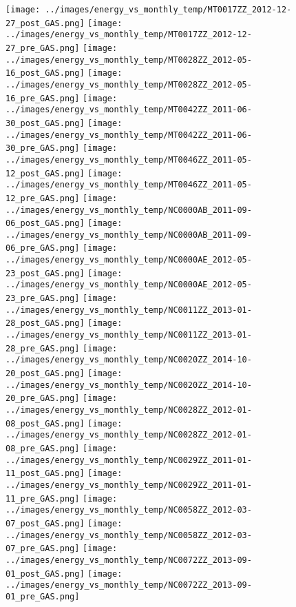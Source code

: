 \clearpage
\begin{figure}
\centering
\texttt{[image: ../images/energy\_vs\_monthly\_temp/MT0017ZZ\_2012-12-27\_post\_GAS.png]}
\texttt{[image: ../images/energy\_vs\_monthly\_temp/MT0017ZZ\_2012-12-27\_pre\_GAS.png]}
\texttt{[image: ../images/energy\_vs\_monthly\_temp/MT0028ZZ\_2012-05-16\_post\_GAS.png]}
\texttt{[image: ../images/energy\_vs\_monthly\_temp/MT0028ZZ\_2012-05-16\_pre\_GAS.png]}
\texttt{[image: ../images/energy\_vs\_monthly\_temp/MT0042ZZ\_2011-06-30\_post\_GAS.png]}
\texttt{[image: ../images/energy\_vs\_monthly\_temp/MT0042ZZ\_2011-06-30\_pre\_GAS.png]}
\texttt{[image: ../images/energy\_vs\_monthly\_temp/MT0046ZZ\_2011-05-12\_post\_GAS.png]}
\texttt{[image: ../images/energy\_vs\_monthly\_temp/MT0046ZZ\_2011-05-12\_pre\_GAS.png]}
\texttt{[image: ../images/energy\_vs\_monthly\_temp/NC0000AB\_2011-09-06\_post\_GAS.png]}
\texttt{[image: ../images/energy\_vs\_monthly\_temp/NC0000AB\_2011-09-06\_pre\_GAS.png]}
\texttt{[image: ../images/energy\_vs\_monthly\_temp/NC0000AE\_2012-05-23\_post\_GAS.png]}
\texttt{[image: ../images/energy\_vs\_monthly\_temp/NC0000AE\_2012-05-23\_pre\_GAS.png]}
\texttt{[image: ../images/energy\_vs\_monthly\_temp/NC0011ZZ\_2013-01-28\_post\_GAS.png]}
\texttt{[image: ../images/energy\_vs\_monthly\_temp/NC0011ZZ\_2013-01-28\_pre\_GAS.png]}
\texttt{[image: ../images/energy\_vs\_monthly\_temp/NC0020ZZ\_2014-10-20\_post\_GAS.png]}
\texttt{[image: ../images/energy\_vs\_monthly\_temp/NC0020ZZ\_2014-10-20\_pre\_GAS.png]}
\texttt{[image: ../images/energy\_vs\_monthly\_temp/NC0028ZZ\_2012-01-08\_post\_GAS.png]}
\texttt{[image: ../images/energy\_vs\_monthly\_temp/NC0028ZZ\_2012-01-08\_pre\_GAS.png]}
\texttt{[image: ../images/energy\_vs\_monthly\_temp/NC0029ZZ\_2011-01-11\_post\_GAS.png]}
\texttt{[image: ../images/energy\_vs\_monthly\_temp/NC0029ZZ\_2011-01-11\_pre\_GAS.png]}
\texttt{[image: ../images/energy\_vs\_monthly\_temp/NC0058ZZ\_2012-03-07\_post\_GAS.png]}
\texttt{[image: ../images/energy\_vs\_monthly\_temp/NC0058ZZ\_2012-03-07\_pre\_GAS.png]}
\texttt{[image: ../images/energy\_vs\_monthly\_temp/NC0072ZZ\_2013-09-01\_post\_GAS.png]}
\texttt{[image: ../images/energy\_vs\_monthly\_temp/NC0072ZZ\_2013-09-01\_pre\_GAS.png]}
\end{figure}
